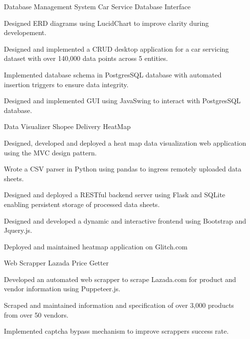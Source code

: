 \begin{cventries}
    \cventry
    {Database Management System} %
    {Car Service Database Interface} %
    {\href{https://github.com/giathuan123/cs166-project}{\faGithubSquare}} %
    {\diJavaPlain \diPostgresqlPlain } %
    {
        \begin{cvitems} %
            \item Designed ERD diagrams using LucidChart to improve clarity during developement.
            \item Designed and implemented a CRUD desktop application for a car servicing dataset
            with over 140,000 data points across 5 entities.
            \item Implemented database schema in PostgresSQL database with automated insertion
            triggers to ensure data integrity.
            \item Designed and implemented GUI using JavaSwing to interact with PostgresSQL
            database.
        \end{cvitems}
    }
    \cventry
    {Data Visualizer} %
    {Shopee Delivery HeatMap} %
    {\href{https://github.com/giathuan123/HeatMap}{\faGithubSquare}} %
    {\diExpressOriginal \diNodejsPlain \diBootstrapPlain \diJqueryPlain \diPythonPlain } %
    {
        \begin{cvitems} %
            \item Designed, developed and deployed a heat map data visualization web application
            using the MVC design pattern.
            \item Wrote a CSV parser in Python using pandas to ingress remotely uploaded data
            sheets.
            \item Designed and deployed a RESTful backend server using Flask and SQLite enabling
            persistent storage of processed data sheets.
            \item Designed and developed a dynamic and interactive frontend using Bootstrap and
            Jquery.js.
            \item Deployed and maintained heatmap application on Glitch.com
        \end{cvitems}
    }
    \cventry
    {Web Scrapper} %
    {Lazada Price Getter} %
    {\href{https://www.google.com}{\faGithubSquare}} %
    {\diNodejsPlain \space \space  } %
    {
        \begin{cvitems} %
            \item Developed an automated web scrapper to scrape Lazada.com for product and vendor
            information using Puppeteer.js.
            \item Scraped and maintained information and specification of over 3,000 products
            from over 50 vendors.
            \item Implemented captcha bypass mechanism to improve scrappers success rate.
        \end{cvitems}
    }
\end{cventries}
